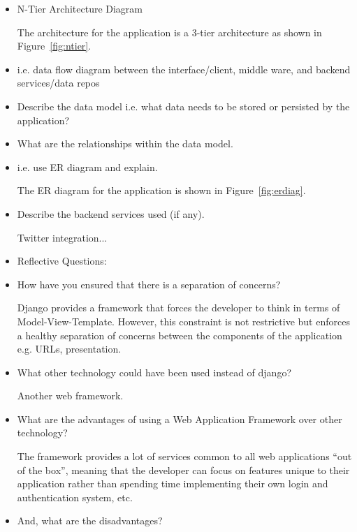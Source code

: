 \documentclass{sig-alt-release2}
\begin{document}
\begin{itemize}
\item	N-Tier Architecture Diagram

The architecture for the application is a 3-tier architecture as shown
in Figure~\ref{fig:ntier}.

\item	i.e. data flow diagram between the interface/client, middle ware,
and backend services/data repos


\item	Describe the data model i.e. what data needs to be stored or
persisted by the application?



\item	What are the relationships within the data model.
\item	i.e. use ER diagram and explain.

The ER diagram for the application is shown in Figure~\ref{fig:erdiag}.



\item	Describe the backend services used (if any).

Twitter integration...

\item	Reflective Questions: 
\item	How have you ensured that there is a separation of concerns?

Django provides a framework that forces the developer to think in terms
of Model-View-Template. However, this constraint is not restrictive but
enforces a healthy separation of concerns between the components of
the application e.g. URLs, presentation.

\item	What other technology could have been used instead of django?

Another web framework.

\item	What are the advantages of using a Web Application Framework
over other technology?

The framework provides a lot of services common to all web applications
``out of the box'', meaning that the developer can focus on features
unique to their application rather than spending time implementing their
own login and authentication system, etc.

\item	And, what are the disadvantages?

\end{itemize}
\end{document}
